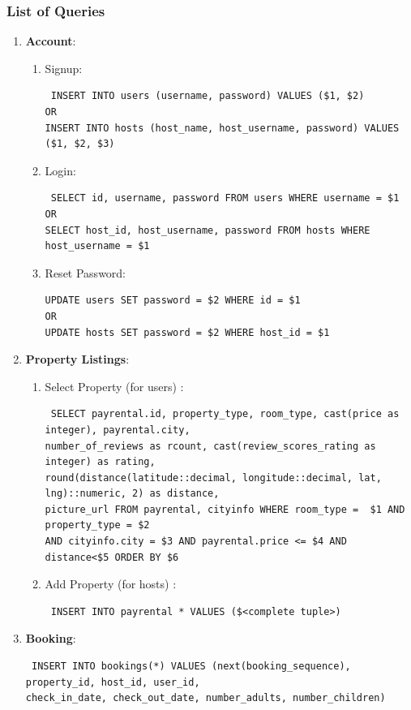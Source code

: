 \documentclass[10pt]{article}
\begin{document}
\subsubsection{List of Queries}
\begin{enumerate}
    \item \textbf{Account}:
    \begin{enumerate}
        \item Signup: \begin{verbatim} INSERT INTO users (username, password) VALUES ($1, $2) 
OR
INSERT INTO hosts (host_name, host_username, password) VALUES ($1, $2, $3)\end{verbatim}
        \item Login: \begin{verbatim} SELECT id, username, password FROM users WHERE username = $1 
OR
SELECT host_id, host_username, password FROM hosts WHERE host_username = $1\end{verbatim}
        \item Reset Password: \begin{verbatim}UPDATE users SET password = $2 WHERE id = $1
OR
UPDATE hosts SET password = $2 WHERE host_id = $1\end{verbatim}
    \end{enumerate}
    \item \textbf{Property Listings}:
    \begin{enumerate}
        \item Select Property (for users) : 
        \begin{verbatim} SELECT payrental.id, property_type, room_type, cast(price as integer), payrental.city, 
number_of_reviews as rcount, cast(review_scores_rating as integer) as rating, 
round(distance(latitude::decimal, longitude::decimal, lat, lng)::numeric, 2) as distance, 
picture_url FROM payrental, cityinfo WHERE room_type =  $1 AND property_type = $2 
AND cityinfo.city = $3 AND payrental.price <= $4 AND distance<$5 ORDER BY $6 \end{verbatim}
        \item Add Property (for hosts) : \begin{verbatim} INSERT INTO payrental * VALUES ($<complete tuple>) \end{verbatim}
    \end{enumerate}
    \item \textbf{Booking}: \begin{verbatim} INSERT INTO bookings(*) VALUES (next(booking_sequence), property_id, host_id, user_id, 
check_in_date, check_out_date, number_adults, number_children) \end{verbatim}
    

\end{enumerate}
\end{document}
